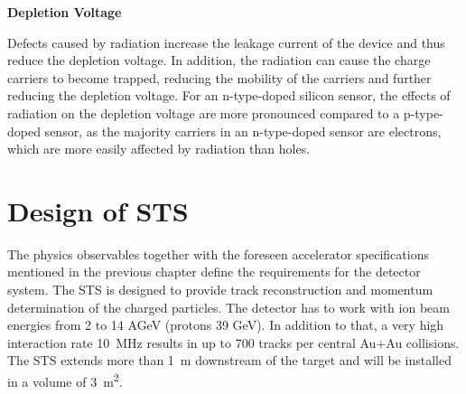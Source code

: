 \textbf{Depletion Voltage}\bigbreak

Defects caused by radiation increase the leakage current of the device and thus reduce the depletion voltage. In addition, the radiation can cause the charge carriers to become trapped, reducing the mobility of the carriers and further reducing the depletion voltage. For an n-type-doped silicon sensor, the effects of radiation on the depletion voltage are more pronounced compared to a p-type-doped sensor, as the majority carriers in an n-type-doped sensor are electrons, which are more easily affected by radiation than holes. 



\section{Design of STS}
\label{STS}

The physics observables together with the foreseen accelerator specifications mentioned in the previous chapter define the requirements for the detector system. The \gls{STS} is designed to provide track reconstruction and momentum determination of the charged particles. The detector has to work with ion beam energies from 2 to 14 AGeV (protons 39 GeV). In addition to that, a very high interaction rate 10~MHz results in up to 700 tracks per central Au+Au collisions. The \gls{STS} extends more than \SI{1}{\metre} downstream of the target and will be installed in a volume of \SI{3}{\square\metre}. 

